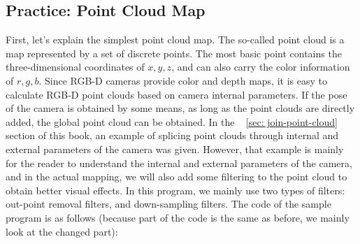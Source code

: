 \subsection{Practice: Point Cloud Map}
First, let's explain the simplest point cloud map. The so-called point cloud is a map represented by a set of discrete points. The most basic point contains the three-dimensional coordinates of $ x, y, z $, and can also carry the color information of $ r, g, b $. Since RGB-D cameras provide color and depth maps, it is easy to calculate RGB-D point clouds based on camera internal parameters. If the pose of the camera is obtained by some means, as long as the point clouds are directly added, the global point cloud can be obtained. In the ~ \ref{sec: join-point-cloud} ~ section of this book, an example of splicing point clouds through internal and external parameters of the camera was given. However, that example is mainly for the reader to understand the internal and external parameters of the camera, and in the actual mapping, we will also add some filtering to the point cloud to obtain better visual effects. In this program, we mainly use two types of filters: out-point removal filters, and down-sampling filters. The code of the sample program is as follows (because part of the code is the same as before, we mainly look at the changed part):

